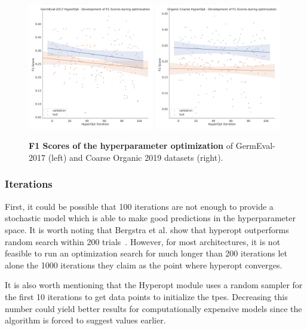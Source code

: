 \begin{figure}[ht]
    \centering
    \includegraphics[width=0.49\textwidth]{figures/06_results/06_hp_ge_lm_f1time}
    \includegraphics[width=0.49\textwidth]{figures/06_results/06_hp_og_lm_f1time}
    \caption{\textbf{F1 Scores of the hyperparameter optimization} of GermEval-2017 {(left)} and Coarse Organic 2019 datasets {(right)}.}
    \label{fig:06_F1GermEvalHp}
\end{figure}

\subsubsection*{Iterations}

First, it could be possible that 100 iterations are not enough to provide a stochastic model which is able to make good predictions in the hyperparameter space. It is worth noting that Bergstra et al. show that hyperopt outperforms random search within 200 trials~\cite{Bergstra2013}. However, for most architectures, it is not feasible to run an optimization search for much longer than 200 iterations let alone the 1000 iterations they claim as the point where hyperopt converges. 
\medskip

It is also worth mentioning that the Hyperopt module uses a random sampler for the first 10 iterations to get data points to initialize the \glspl{tpe}. Decreasing this number could yield better results for computationally expensive models since the algorithm is forced to suggest values earlier.

